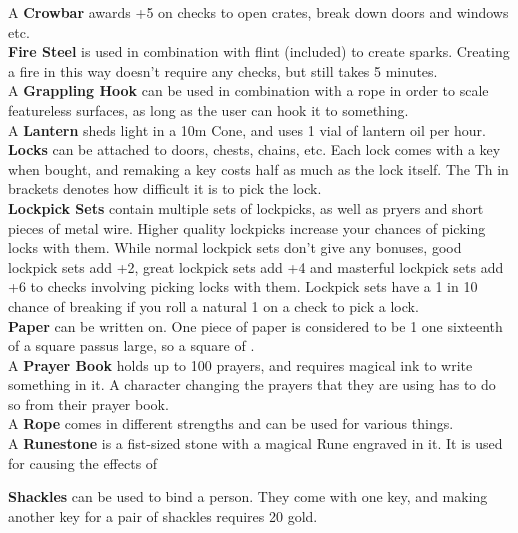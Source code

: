 A \textbf{Crowbar} awards +5 on checks to open crates, break down doors and windows etc.\\

\textbf{Fire Steel} is used in combination with flint (included) to create sparks.
Creating a fire in this way doesn't require any checks, but still takes 5 minutes.\\

A \textbf{Grappling Hook} can be used in combination with a rope in order to scale featureless surfaces, as long as the user can hook it to something.\\

A \textbf{Lantern} sheds light in a 10m Cone, and uses 1 vial of lantern oil per hour.\\

\textbf{Locks} can be attached to doors, chests, chains, etc.
Each lock comes with a key when bought, and remaking a key costs half as much as the lock itself.
The Th in brackets denotes how difficult it is to pick the lock.\\

\textbf{Lockpick Sets} contain multiple sets of lockpicks, as well as pryers and short pieces of metal wire.
Higher quality lockpicks increase your chances of picking locks with them.
While normal lockpick sets don't give any bonuses, good lockpick sets add +2, great lockpick sets add +4 and masterful lockpick sets add +6 to checks involving picking locks with them.
Lockpick sets have a 1 in 10 chance of breaking if you roll a natural 1 on a check to pick a lock.\\

\textbf{Paper} can be written on.
One piece of paper is considered to be 1 one sixteenth of a square passus large, so a square of  .\\

A \textbf{Prayer Book} holds up to 100 prayers, and requires magical ink to write something in it.
A character changing the prayers that they are using has to do so from their prayer book.\\

A \textbf{Rope} comes in different strengths and can be used for various things.\\

A \textbf{Runestone} is a fist-sized stone with a magical Rune engraved in it. 
It is used for causing the effects of~

\textbf{Shackles} can be used to bind a person.
They come with one key, and making another key for a pair of shackles requires 20 gold.\\


